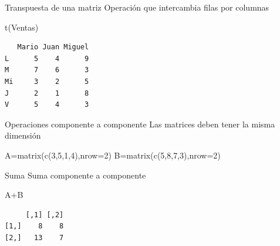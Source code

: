 \documentclass[
  ignorenonframetext,
  aspectratio=169,
  spanish,
]{beamer}
\newenvironment{Shaded}{\begin{snugshade}}{\end{snugshade}}
\newcommand{\AttributeTok}[1]{\textcolor[rgb]{0.40,0.45,0.13}{#1}}
\newcommand{\DecValTok}[1]{\textcolor[rgb]{0.68,0.00,0.00}{#1}}
\newcommand{\FunctionTok}[1]{\textcolor[rgb]{0.28,0.35,0.67}{#1}}
\newcommand{\NormalTok}[1]{\textcolor[rgb]{0.00,0.23,0.31}{#1}}
\newcommand{\OtherTok}[1]{\textcolor[rgb]{0.00,0.23,0.31}{#1}}
\newcommand{\SpecialCharTok}[1]{\textcolor[rgb]{0.37,0.37,0.37}{#1}}
\begin{document}
\begin{frame}[fragile]{Transpuesta de una matriz}
\label{transpuesta-de-una-matriz}
Operación que intercambia filas por columnas

\begin{Shaded}
\begin{Highlighting}[]
\FunctionTok{t}\NormalTok{(Ventas)}
\end{Highlighting}
\end{Shaded}

\begin{verbatim}
   Mario Juan Miguel
L      5    4      9
M      7    6      3
Mi     3    2      5
J      2    1      8
V      5    4      3
\end{verbatim}
\end{frame}

\begin{frame}[fragile]{Operaciones componente a componente}
\label{operaciones-componente-a-componente}
Las matrices deben tener la misma dimensión

\begin{Shaded}
\begin{Highlighting}[]
\NormalTok{A}\OtherTok{=}\FunctionTok{matrix}\NormalTok{(}\FunctionTok{c}\NormalTok{(}\DecValTok{3}\NormalTok{,}\DecValTok{5}\NormalTok{,}\DecValTok{1}\NormalTok{,}\DecValTok{4}\NormalTok{),}\AttributeTok{nrow=}\DecValTok{2}\NormalTok{) }
\NormalTok{B}\OtherTok{=}\FunctionTok{matrix}\NormalTok{(}\FunctionTok{c}\NormalTok{(}\DecValTok{5}\NormalTok{,}\DecValTok{8}\NormalTok{,}\DecValTok{7}\NormalTok{,}\DecValTok{3}\NormalTok{),}\AttributeTok{nrow=}\DecValTok{2}\NormalTok{) }
\end{Highlighting}
\end{Shaded}

\begin{block}{Suma}
\label{suma}
Suma componente a componente

\begin{Shaded}
\begin{Highlighting}[]
\NormalTok{A}\SpecialCharTok{+}\NormalTok{B   }
\end{Highlighting}
\end{Shaded}

\begin{verbatim}
     [,1] [,2]
[1,]    8    8
[2,]   13    7
\end{verbatim}
\end{block}
\end{frame}
\end{document}
